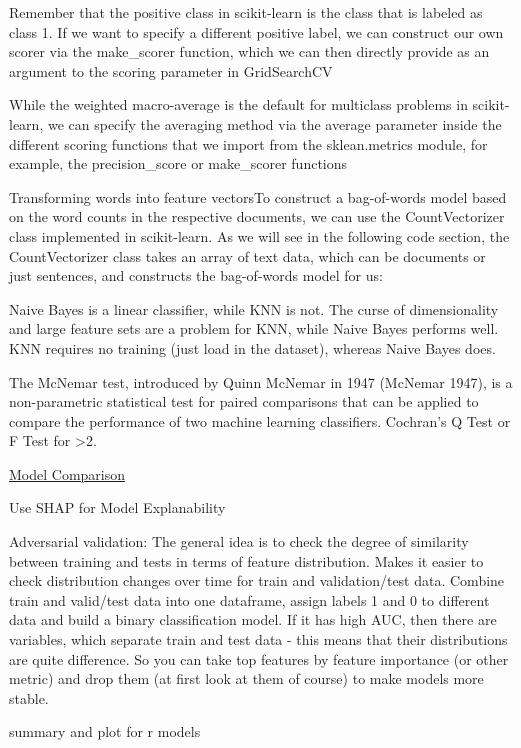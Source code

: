 \documentclass[]{book}
\begin{document}
Remember that the positive class in scikit-learn is the class that is labeled as class 1. If we want to specify a different positive label, we can construct our own scorer via the make\_scorer function, which we can then directly provide as an argument to the scoring parameter in GridSearchCV

While the weighted macro-average is the default for multiclass problems in scikit-learn, we can specify the averaging method via the average parameter inside the different scoring functions that we import from the sklean.metrics module, for example, the precision\_score or make\_scorer functions

Transforming words into feature vectorsTo construct a bag-of-words model based on the word counts in the respective documents, we can use the CountVectorizer class implemented in scikit-learn. As we will see in the following code section, the CountVectorizer class takes an array of text data, which can be documents or just sentences, and constructs the bag-of-words model for us:

Naive Bayes is a linear classifier, while KNN is not. The curse of dimensionality and large feature sets are a problem for KNN, while Naive Bayes performs well. KNN requires no training (just load in the dataset), whereas Naive Bayes does.

The McNemar test, introduced by Quinn McNemar in 1947 (McNemar 1947), is a non-parametric statistical test for paired comparisons that can be applied to compare the performance of two machine learning classifiers. Cochran's Q Test or F Test for \textgreater{}2.

\href{http://hunch.net/?p=224}{Model Comparison}

Use SHAP for Model Explanability

Adversarial validation: The general idea is to check the degree of similarity between training and tests in terms of feature distribution. Makes it easier to check distribution changes over time for train and validation/test data. Combine train and valid/test data into one dataframe, assign labels 1 and 0 to different data and build a binary classification model. If it has high AUC, then there are variables, which separate train and test data - this means that their distributions are quite difference. So you can take top features by feature importance (or other metric) and drop them (at first look at them of course) to make models more stable.

summary and plot for r models
\end{document}
